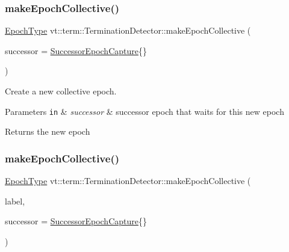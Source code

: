 \subsubsection{\texorpdfstring{make\+Epoch\+Collective()}{makeEpochCollective()}\hspace{0.1cm}{\footnotesize\ttfamily [1/2]}}
{\footnotesize\ttfamily \hyperlink{namespacevt_a985a5adf291c34a3ca263b3378388236}{Epoch\+Type} vt\+::term\+::\+Termination\+Detector\+::make\+Epoch\+Collective (\begin{DoxyParamCaption}\item[{\hyperlink{structvt_1_1term_1_1_successor_epoch_capture}{Successor\+Epoch\+Capture}}]{successor = {\ttfamily \hyperlink{structvt_1_1term_1_1_successor_epoch_capture}{Successor\+Epoch\+Capture}\{\}} }\end{DoxyParamCaption})}



Create a new collective epoch. 


\begin{DoxyParams}[1]{Parameters}
\mbox{\tt in}  & {\em successor} & successor epoch that waits for this new epoch\\
\hline
\end{DoxyParams}
\begin{DoxyReturn}{Returns}
the new epoch 
\end{DoxyReturn}
\mbox{\label{structvt_1_1term_1_1_termination_detector_a67f24233f3d3e02ca7c1d6dc94e343c9}} 
\subsubsection{\texorpdfstring{make\+Epoch\+Collective()}{makeEpochCollective()}\hspace{0.1cm}{\footnotesize\ttfamily [2/2]}}
{\footnotesize\ttfamily \hyperlink{namespacevt_a985a5adf291c34a3ca263b3378388236}{Epoch\+Type} vt\+::term\+::\+Termination\+Detector\+::make\+Epoch\+Collective (\begin{DoxyParamCaption}\item[{std\+::string const \&}]{label,  }\item[{\hyperlink{structvt_1_1term_1_1_successor_epoch_capture}{Successor\+Epoch\+Capture}}]{successor = {\ttfamily \hyperlink{structvt_1_1term_1_1_successor_epoch_capture}{Successor\+Epoch\+Capture}\{\}} }\end{DoxyParamCaption})}



